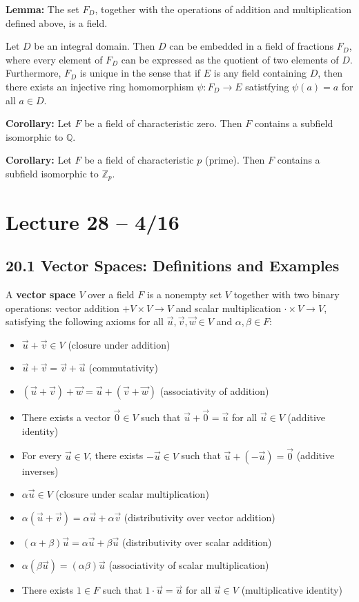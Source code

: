 \documentclass{article}
\newcommand{\Z}{\mathbb{Z}}
\newcommand{\Q}{\mathbb{Q}}
\begin{document}
\textbf{Lemma:} The set $F_D$, together with the operations of addition and multiplication defined above, is a field.

\begin{theorem}
  Let $D$ be an integral domain. Then $D$ can be embedded in a field of fractions $F_D$, where every element of $F_D$ can be expressed as the quotient of two elements of $D$. Furthermore, $F_D$ is unique in the sense that if $E$ is any field containing $D$, then there exists an injective ring homomorphism $\psi:F_D\to E$ satistfying $\psi(a)=a$ for all $a\in D$.
\end{theorem}

\textbf{Corollary:} Let $F$ be a field of characteristic zero. Then $F$ contains a subfield isomorphic to $\Q$.

\textbf{Corollary:} Let $F$ be a field of characteristic $p$ (prime). Then $F$ contains a subfield isomorphic to $\Z_p$.

\section{Lecture 28 -- 4/16}
\subsection{20.1 Vector Spaces: Definitions and Examples}
A \textbf{vector space} $V$ over a field $F$ is a nonempty set $V$ together with two binary operations: vector addition $+V\times V\to V$ and scalar multiplication $\cdot\times V\to V$, satisfying the following axioms for all $\vec{u},\vec{v},\vec{w}\in V$ and $\alpha,\beta\in F$:

\begin{itemize}
  \item $\vec{u}+\vec{v}\in V$ (closure under addition)
  \item $\vec{u}+\vec{v}=\vec{v}+\vec{u}$ (commutativity)
  \item $(\vec{u}+\vec{v})+\vec{w}=\vec{u}+(\vec{v}+\vec{w})$ (associativity of addition)
  \item There exists a vector $\vec{0}\in V$ such that $\vec{u}+\vec{0}=\vec{u}$ for all $\vec{u}\in V$ (additive identity)
  \item For every $\vec{u}\in V$, there exists $-\vec{u}\in V$ such that $\vec{u}+(-\vec{u})=\vec{0}$ (additive inverses)
  \item $\alpha\vec{u}\in V$ (closure under scalar multiplication)
  \item $\alpha(\vec{u}+\vec{v})=\alpha\vec{u}+\alpha\vec{v}$ (distributivity over vector addition)
  \item $(\alpha+\beta)\vec{u}=\alpha\vec{u}+\beta\vec{u}$ (distributivity over scalar addition)
  \item $\alpha(\beta\vec{u})=(\alpha\beta)\vec{u}$ (associativity of scalar multiplication)
  \item There exists $1\in F$ such that $1\cdot\vec{u}=\vec{u}$ for all $\vec{u}\in V$ (multiplicative identity)
\end{itemize}
\end{document}
